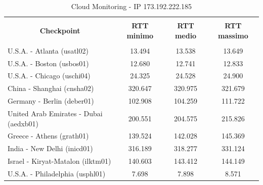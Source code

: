\documentclass[a4paper,11pt]{book}
\begin{document}
\begin{table}[!ht]
\begin{tabular}{|l|c|c|c|}
\hline
\multicolumn{1}{|c|}{\textbf{}} & {\textbf{}} & {\textbf{}} & {\textbf{}}\\
\multicolumn{1}{|c|}{\textbf{Checkpoint}} & {\textbf{RTT minimo}} & {\textbf{RTT medio}} & {\textbf{RTT massimo}}\\
\multicolumn{1}{|c|}{\textbf{}} & {\textbf{}} & {\textbf{}} & {\textbf{}}\\
\hline
U.S.A. - Atlanta (usatl02) & 13.494 & 13.538 & 13.649\\
U.S.A. - Boston (usbos01) & 12.680 & 12.741 & 12.833\\
U.S.A. - Chicago (uschi04) & 24.325 & 24.528 & 24.900\\
China - Shanghai (cnsha02) & 320.647 & 320.975 & 321.679\\
Germany - Berlin (deber01) & 102.908 & 104.259 & 111.722\\
United Arab Emirates - Dubai (aedxb01) & 200.551 & 204.575 & 215.826\\
Greece - Athens (grath01) & 139.524 & 142.028 & 145.369\\
India - New Delhi (inicd01) & 316.189 & 318.277 & 331.124\\
Israel - Kiryat-Matalon (ilktm01) & 140.603 & 143.412 & 144.149\\
U.S.A. - Philadelphia (usphl01) & 7.698 & 7.898 & 8.571\\
\hline
\end{tabular}
\caption{Cloud Monitoring - IP 173.192.222.185}\label{table:Monitoring_2}
\end{table}

~
\end{document}
